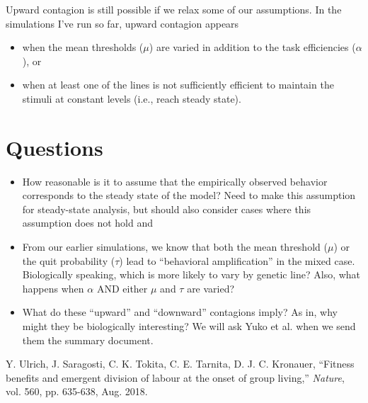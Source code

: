 \documentclass[10pt]{article}
\begin{document}
Upward contagion is still possible if we relax some of our assumptions. In the simulations I've run so far, upward contagion appears
\begin{itemize}
    \item when the mean thresholds ($\mu$) are varied in addition to the task efficiencies ($\alpha$), or
    \item when at least one of the lines is not sufficiently efficient to maintain the stimuli at constant levels (i.e., reach steady state).
\end{itemize}

\section{Questions}
\begin{itemize}
    \item How reasonable is it to assume that the empirically observed behavior corresponds to the steady state of the model? {\color{orange}Need to make this assumption for steady-state analysis, but should also consider cases where this assumption does not hold and }
    
    \item From our earlier simulations, we know that both the mean threshold ($\mu$) or the quit probability ($\tau$) lead to ``behavioral amplification'' in the mixed case.
    Biologically speaking, which is more likely to vary by genetic line? Also, what happens when $\alpha$ AND either $\mu$ and $\tau$ are varied?
    
    \item What do these ``upward'' and ``downward'' contagions imply? As in, why might they be biologically interesting? {\color{orange}We will ask Yuko et al. when we send them the summary document.}
\end{itemize}

\begin{thebibliography}{99}

 Y. Ulrich, J. Saragosti, C. K. Tokita, C. E. Tarnita, D. J. C. Kronauer, ``Fitness benefits and emergent division of labour at the onset of group living,'' \textit{Nature}, vol. 560, pp. 635-638, Aug. 2018.

\end{thebibliography}
\end{document}
